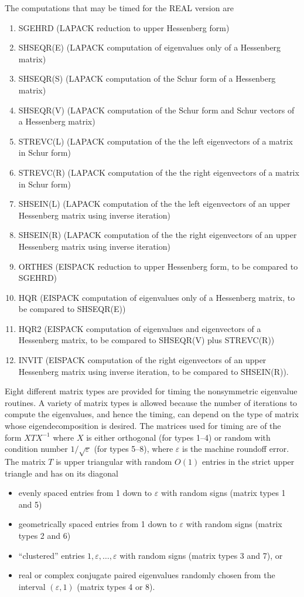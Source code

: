 The computations that may be timed for the REAL version are
\begin{enumerate}
\item SGEHRD (LAPACK reduction to upper Hessenberg form)
\item SHSEQR(E) (LAPACK computation of eigenvalues only of a Hessenberg matrix)
\item SHSEQR(S) (LAPACK computation of the Schur form of a Hessenberg matrix)
\item SHSEQR(V) (LAPACK computation of the Schur form and Schur vectors 
of a Hessenberg matrix)
\item STREVC(L) (LAPACK computation of the the left eigenvectors of a matrix
in Schur form)
\item STREVC(R) (LAPACK computation of the the right eigenvectors of a matrix
in Schur form)
\item SHSEIN(L) (LAPACK computation of the the left eigenvectors of an upper
Hessenberg matrix using inverse iteration)
\item SHSEIN(R) (LAPACK computation of the the right eigenvectors of an upper
Hessenberg matrix using inverse iteration)
\item ORTHES (EISPACK reduction to upper Hessenberg form, to be compared to
SGEHRD)
\item HQR (EISPACK computation of eigenvalues only of a Hessenberg matrix,
to be compared to SHSEQR(E))
\item HQR2 (EISPACK computation of eigenvalues and eigenvectors of a Hessenberg 
matrix, to be compared to SHSEQR(V) plus STREVC(R))
\item INVIT (EISPACK computation of the right eigenvectors of an upper
Hessenberg matrix using inverse iteration, to be compared to SHSEIN(R)).
\end{enumerate}

Eight different matrix types are provided for
timing the nonsymmetric eigenvalue routines.
A variety of matrix types is allowed because the number of iterations
to compute the eigenvalues, and hence the timing, can depend on the
type of matrix whose eigendecomposition is desired.
The matrices used for timing are of the form $XTX^{-1}$ 
where $X$ is either orthogonal (for types 1--4) or random with
condition number $1/ \sqrt{ \varepsilon }$ (for types 5--8),
where $\varepsilon$ is the machine roundoff error.  
The matrix $T$ is upper triangular with 
random $O(1)$ entries in the strict upper triangle and has on its
diagonal
\begin{itemize}
\item evenly spaced entries from 1 down to $\varepsilon$ with random signs
(matrix types 1 and 5)
\item geometrically  spaced entries from 1 down to $\varepsilon$ with random 
signs (matrix types 2 and 6)
\item ``clustered'' entries $1, \varepsilon , \ldots, \varepsilon$  with random
signs (matrix types 3 and 7), or
\item real or complex conjugate paired eigenvalues randomly chosen from
the interval $( \varepsilon , 1 )$ (matrix types 4 or 8).
\end{itemize}

